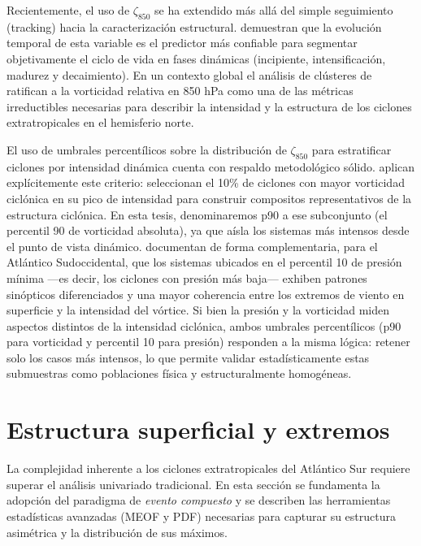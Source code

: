 Recientemente, el uso de $\zeta_{850}$ se ha extendido más allá del simple seguimiento (tracking) hacia la caracterización estructural. \citet{coutodesouza2024new} demuestran que la evolución temporal de esta variable es el predictor más confiable para segmentar objetivamente el ciclo de vida en fases dinámicas (incipiente, intensificación, madurez y decaimiento). En un contexto global el análisis de clústeres de \citet{corner2025classification} ratifican a la vorticidad relativa en 850 hPa como una de las métricas irreductibles necesarias para describir la intensidad y la estructura de los ciclones extratropicales en el hemisferio norte.

El uso de umbrales percentílicos sobre la distribución de $\zeta_{850}$ para estratificar ciclones por intensidad dinámica cuenta con respaldo metodológico sólido. \citet{priestley2022improved} aplican explícitemente este criterio: seleccionan el 10\% de ciclones con mayor vorticidad ciclónica en su pico de intensidad para construir compositos representativos de la estructura ciclónica. En esta tesis, denominaremos p90 a ese subconjunto (el percentil 90 de vorticidad absoluta), ya que aísla los sistemas más intensos desde el punto de vista dinámico. \citet{andrade2024composite} documentan de forma complementaria, para el Atlántico Sudoccidental, que los sistemas ubicados en el percentil 10 de presión mínima —es decir, los ciclones con presión más baja— exhiben patrones sinópticos diferenciados y una mayor coherencia entre los extremos de viento en superficie y la intensidad del vórtice. Si bien la presión y la vorticidad miden aspectos distintos de la intensidad ciclónica, ambos umbrales percentílicos (p90 para vorticidad y percentil 10 para presión) responden a la misma lógica: retener solo los casos más intensos, lo que permite validar estadísticamente estas submuestras como poblaciones física y estructuralmente homogéneas.


\section{Estructura superficial y extremos}\label{sec:tb_compuestos}

La complejidad inherente a los ciclones extratropicales del Atlántico Sur requiere superar el análisis univariado tradicional. En esta sección se fundamenta la adopción del paradigma de \textit{evento compuesto} y se describen las herramientas estadísticas avanzadas (MEOF y PDF) necesarias para capturar su estructura asimétrica y la distribución de sus máximos.

